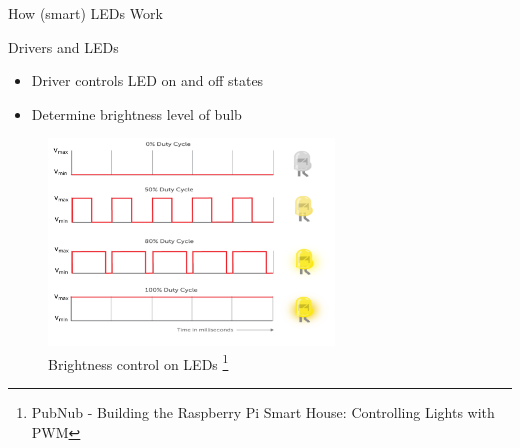\documentclass[11pt,t,usepdftitle=false,aspectratio=169]{beamer}
\begin{document}
\begin{frame}{How (smart) LEDs Work}
{        \begin{block}{Drivers and LEDs}
            \begin{itemize}
                \item Driver controls LED on and off states
                \item Determine brightness level of bulb
            \end{itemize}
        \end{block}
    }
     {
         
        \begin{figure}
            \centering
            \includegraphics[height=5.5cm,keepaspectratio]{img/pwm-duty-cycle.png}
            \caption{\small{Brightness control on LEDs} \footnote{\tiny{PubNub - Building the Raspberry Pi Smart House: Controlling Lights with PWM}}}
        \end{figure}
    }
\end{frame}

\end{document}
